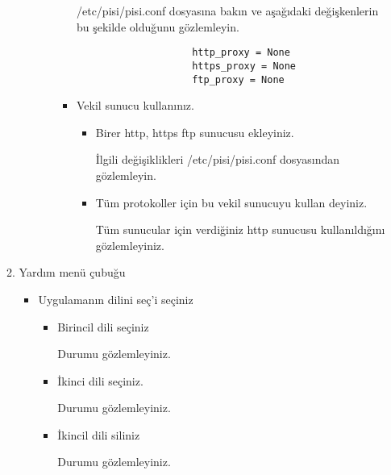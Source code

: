 \documentclass[a4paper,10pt]{article}
\begin{document}
\begin{enumerate}
\begin{enumerate}
\begin{enumerate}
\begin{enumerate}
\begin{itemize}
                    /etc/pisi/pisi.conf dosyasına bakın ve aşağıdaki değişkenlerin bu şekilde olduğunu gözlemleyin.
                    \begin{verbatim}
                    http_proxy = None
                    https_proxy = None
                    ftp_proxy = None
                    \end{verbatim}
    
                    \item Vekil sunucu kullanınız.
    
                    \begin{itemize}
                        \item Birer http, https ftp sunucusu ekleyiniz.
        
                        İlgili değişiklikleri /etc/pisi/pisi.conf dosyasından gözlemleyin.
        
                        \item Tüm protokoller için bu vekil sunucuyu kullan deyiniz. 
        
                        Tüm sunucular için verdiğiniz http sunucusu kullanıldığını gözlemleyiniz.
                    \end{itemize}
                \end{itemize}
                        \end{enumerate}
    \end{enumerate}
\item Yardım menü çubuğu
		
                \begin{itemize}
                    \item Uygulamanın dilini seç'i seçiniz 
                    \begin{itemize}
                        \item Birincil dili seçiniz
			  
			 Durumu gözlemleyiniz.
                        \item İkinci dili seçiniz.
		      
			 Durumu gözlemleyiniz.
                        \item İkincil dili siliniz
		  
			Durumu gözlemleyiniz.
                    \end{itemize}
                \end{itemize}

\end{enumerate}


\end{enumerate}
\end{document}
